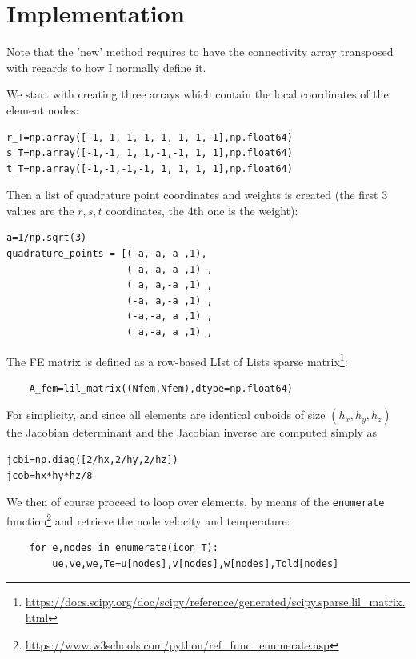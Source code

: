 \section*{Implementation}

Note that the 'new' method requires to have the connectivity 
array transposed with regards to how I normally define it.

We start with creating three arrays which contain 
the local coordinates of the element nodes:
\begin{lstlisting}
r_T=np.array([-1, 1, 1,-1,-1, 1, 1,-1],np.float64)
s_T=np.array([-1,-1, 1, 1,-1,-1, 1, 1],np.float64)
t_T=np.array([-1,-1,-1,-1, 1, 1, 1, 1],np.float64)
\end{lstlisting}

Then a list of quadrature point coordinates and weights is created
(the first 3 values are the $r,s,t$ coordinates, the 4th one is the weight):
\begin{lstlisting}
a=1/np.sqrt(3)
quadrature_points = [(-a,-a,-a ,1),
                     ( a,-a,-a ,1) , 
                     ( a, a,-a ,1) ,
                     (-a, a,-a ,1) ,
                     (-a,-a, a ,1) , 
                     ( a,-a, a ,1) , 
\end{lstlisting}

The FE matrix is defined as a row-based LIst of Lists sparse 
matrix\footnote{\url{https://docs.scipy.org/doc/scipy/reference/generated/scipy.sparse.lil_matrix.html}}:
\begin{lstlisting}
    A_fem=lil_matrix((Nfem,Nfem),dtype=np.float64)
\end{lstlisting}

For simplicity, and since all elements are identical cuboids of size $(h_x,h_y,h_z)$
the Jacobian determinant and the Jacobian inverse are computed simply as
\begin{lstlisting}
jcbi=np.diag([2/hx,2/hy,2/hz])
jcob=hx*hy*hz/8
\end{lstlisting}

We then of course proceed to loop over elements, 
by means of the \lstinline{enumerate} 
function\footnote{\url{https://www.w3schools.com/python/ref_func_enumerate.asp}}
and retrieve the node velocity and temperature:

\begin{lstlisting}
    for e,nodes in enumerate(icon_T):
        ue,ve,we,Te=u[nodes],v[nodes],w[nodes],Told[nodes]
\end{lstlisting}

